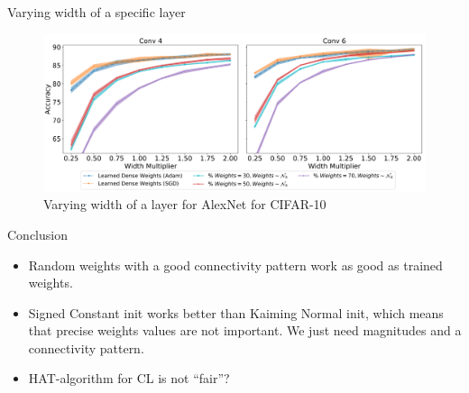 \documentclass[10pt]{beamer}
\begin{document}
\begin{frame}{Varying width of a specific layer}
    \begin{figure}
        \centering
        \includegraphics[width=\textwidth]{images/varying-width-alexnet}
        \caption{Varying width of a layer for AlexNet for CIFAR-10}
    \end{figure}
\end{frame}



%    

%    

\begin{frame}{Conclusion}
\begin{itemize}
    \item\pause Random weights with a good connectivity pattern work as good as trained weights.
    \item\pause Signed Constant init works better than Kaiming Normal init, which means that precise weights values are not important. We just need magnitudes and a connectivity pattern.
    \item\pause HAT-algorithm for CL is not ``fair''?
\end{itemize}
\end{frame}
\end{document}
